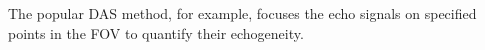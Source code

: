 The popular \ac{DAS} method, for example, focuses
the echo signals on
specified points in
the \ac{FOV} to quantify
their echogeneity.
